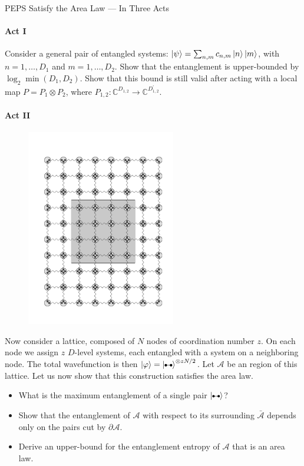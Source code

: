 \documentclass[a4paper,10pt,twoside]{article}
\def\pair{\tikz[baseline=-0.5ex]{
\fill (0,0) circle (1.5pt) coordinate (A);
\fill (1.5ex,0) circle (1.5pt) coordinate (B);
\draw (A)--(B);}
}
\begin{document}
\begin{section}{PEPS Satisfy the Area Law --- In Three Acts}
\paragraph{Act I}
Consider a general pair of entangled systems: $\ket{\psi} = \sum_{n,m} c_{n,m} \ket{n}\ket{m}$, with $n=1,\dots,D_1$ and $m=1,\dots,D_2$.
Show that the entanglement is upper-bounded by $\log_2\min(D_1,D_2)$.
Show that this bound is still valid after acting with a local map $P = P_1 \otimes P_2$, where  $P_{1,2}: \mathbb{C}^{D_{1,2}} \to \mathbb{C}^{D_{1,2}^\prime}$.

\paragraph{Act II}
\begin{figure}
\includegraphics[width=6.5cm]{peps.pdf}
\end{figure}
Now consider a lattice, composed of $N$ nodes of coordination number $z$.
On each node we assign $z$ $D$-level systems, each entangled with a system on a neighboring node.
The total wavefunction is then $\ket{\varphi} = \ket{\pair}^{\otimes z N/2}$. 
Let $\mathcal{A}$ be an region of this lattice.
Let us now show that this construction satisfies the area law.
\begin{itemize}
  \item What is the maximum entanglement of a single pair $\ket{\pair}$?
  \item Show that the entanglement of $\mathcal{A}$ with respect to its surrounding $\bar{\mathcal{A}}$ depends only on the pairs cut by $\partial \mathcal{A}$.
  \item Derive an upper-bound for the entanglement entropy of $\mathcal{A}$ that is an area law.
\end{itemize}


\end{section}
\end{document}
